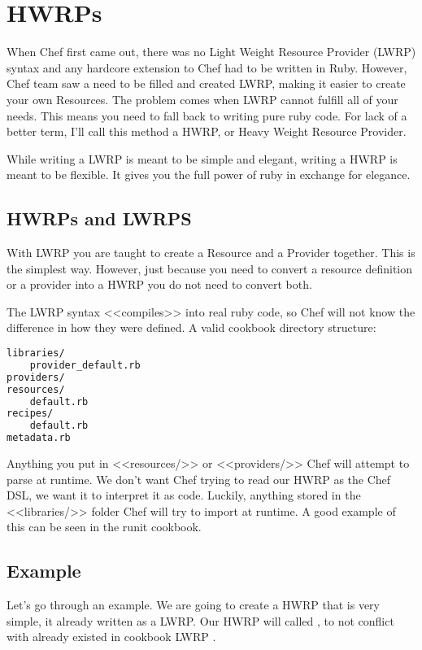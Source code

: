 \section{HWRPs}

When Chef first came out, there was no Light Weight Resource Provider (LWRP) syntax and any hardcore extension to Chef had to be written in Ruby. However, Chef team saw a need to be filled and created LWRP, making it easier to create your own Resources. The problem comes when LWRP cannot fulfill all of your needs. This means you need to fall back to writing pure ruby code. For lack of a better term, I'll call this method a HWRP, or Heavy Weight Resource Provider.

While writing a LWRP is meant to be simple and elegant, writing a HWRP is meant to be flexible. It gives you the full power of ruby in exchange for elegance.

\subsection{HWRPs and LWRPS}

With LWRP you are taught to create a Resource and a Provider together. This is the simplest way. However, just because you need to convert a resource definition or a provider into a HWRP you do not need to convert both.

The LWRP syntax <<compiles>> into real ruby code, so Chef will not know the difference in how they were defined. A valid cookbook directory structure:

\begin{lstlisting}[language=Bash,label=lst:cookbook-hwrp1]
libraries/
    provider_default.rb
providers/
resources/
    default.rb
recipes/
    default.rb
metadata.rb
\end{lstlisting}

Anything you put in <<resources/>> or <<providers/>> Chef will attempt to parse at runtime. We don't want Chef trying to read our HWRP as the Chef DSL, we want it to interpret it as code. Luckily, anything stored in the <<libraries/>> folder Chef will try to import at runtime. A good example of this can be seen in the runit cookbook.

\subsection{Example}

Let's go through an example. We are going to create a HWRP that is very simple, it already written as a LWRP. Our HWRP will called , to not conflict with already existed in cookbook LWRP .


